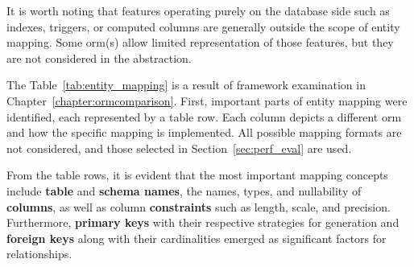 It is worth noting that features operating purely on the database side such as indexes, triggers, or computed columns are generally outside the scope of entity mapping. Some \acrshort{orm}(s) allow limited representation of those features, but they are not considered in the abstraction.

The Table~\ref{tab:entity_mapping} is a result of framework examination in Chapter~\ref{chapter:ormcomparison}. First, important parts of entity mapping were identified, each represented by a table row. Each column depicts a different \acrshort{orm} and how the specific mapping is implemented. All possible mapping formats are not considered, and those selected in Section~\ref{sec:perf_eval} are used. 

From the table rows, it is evident that the most important mapping concepts include \textbf{table} and \textbf{schema names}, the names, types, and nullability of \textbf{columns}, as well as column \textbf{constraints} such as length, scale, and precision. Furthermore, \textbf{primary keys} with their respective strategies for generation and \textbf{foreign keys} along with their cardinalities emerged as significant factors for relationships.

